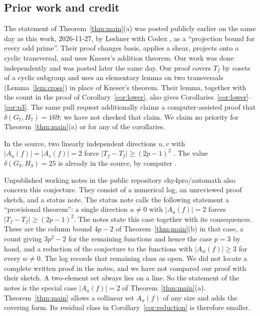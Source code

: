 \documentclass[11pt]{amsart}
\theoremstyle{definition}\newtheorem{definition}[theorem]{Definition}
\theoremstyle{remark}\newtheorem{remark}[theorem]{Remark}
\newcommand{\abs}[1]{\lvert #1\rvert}
\begin{document}
\subsection{Prior work and credit}\label{sec:prior}
The statement of Theorem~\ref{thm:main}(a) was posted publicly earlier on the same day as this work, 2026-11-27, by Leshner with Codex \cite{leshner}, as a ``projection bound for every odd prime''.
Their proof changes basis, applies a shear, projects onto a cyclic transversal, and uses Kneser's addition theorem.
Our work was done independently and was posted later the same day.
Our proof covers \(T_f\) by cosets of a cyclic subgroup and uses an elementary lemma on two transversals (Lemma~\ref{lem:cross}) in place of Kneser's theorem.
Their lemma, together with the count in the proof of Corollary~\ref{cor:lower}, also gives Corollaries~\ref{cor:lower}--\ref{cor:p3}.
The same pull request additionally claims a computer-assisted proof that \(\delta(G_7,H_7)=169\); we have not checked that claim.
We claim no priority for Theorem~\ref{thm:main}(a) or for any of the corollaries.

In the source, two linearly independent directions \(u,v\) with \(\abs{A_u(f)}=\abs{A_v(f)}=2\) force \(\abs{T_f-T_f}\ge(2p-1)^2\) \cite[Lemma~6.4]{BPT}.
The value \(\delta(G_3,H_3)=25\) is already in the source, by computer \cite[\S6.4]{BPT}.

Unpublished working notes in the public repository chy4pro/automath \cite{automath} also concern this conjecture.
They consist of a numerical log, an unreviewed proof sketch, and a status note.
The status note calls the following statement a ``provisional theorem'': a single direction \(u\ne0\) with \(\abs{A_u(f)}=2\) forces \(\abs{T_f-T_f}\ge(2p-1)^2\).
The notes state this case together with its consequences.
These are the column bound \(4p-2\) of Theorem~\ref{thm:main}(b) in that case, a count giving \(3p^2-2\) for the remaining functions and hence the case \(p=3\) by hand, and a reduction of the conjecture to the functions with \(\abs{A_w(f)}\ge3\) for every \(w\ne0\).
The log records that remaining class as open.
We did not locate a complete written proof in the notes, and we have not compared our proof with their sketch.
A two-element set always lies on a line.
So the statement of the notes is the special case \(\abs{A_u(f)}=2\) of Theorem~\ref{thm:main}(a).
Theorem~\ref{thm:main} allows a collinear set \(A_u(f)\) of any size and adds the covering form.
Its residual class in Corollary~\ref{cor:reduction} is therefore smaller.
\end{document}
